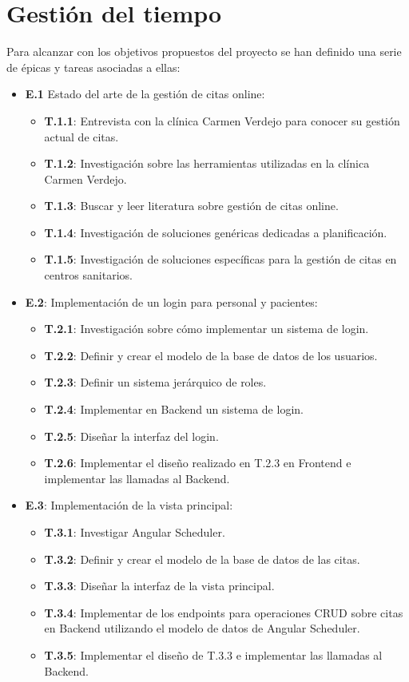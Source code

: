 \section{Gestión del tiempo}
Para alcanzar con los objetivos propuestos del proyecto se han definido una serie de épicas y tareas asociadas a ellas:
\begin{itemize}
    \item \textbf{E.1} Estado del arte de la gestión de citas online:
    \begin{itemize}
        \item \textbf{T.1.1}: Entrevista con la clínica Carmen Verdejo para conocer su gestión actual de citas.
        \item \textbf{T.1.2}: Investigación sobre las herramientas utilizadas en la clínica Carmen Verdejo.
        \item \textbf{T.1.3}: Buscar y leer literatura sobre gestión de citas online.
        \item \textbf{T.1.4}: Investigación de soluciones genéricas dedicadas a planificación.
        \item \textbf{T.1.5}: Investigación de soluciones específicas para la gestión de citas en centros sanitarios.
    \end{itemize}
    
    \item \textbf{E.2}: Implementación de un login para personal y pacientes:
    \begin{itemize}
        \item \textbf{T.2.1}: Investigación sobre cómo implementar un sistema de login.
        \item \textbf{T.2.2}: Definir y crear el modelo de la base de datos de los usuarios.
        \item \textbf{T.2.3}: Definir un sistema jerárquico de roles.
        \item \textbf{T.2.4}: Implementar en Backend un sistema de login.
        \item \textbf{T.2.5}: Diseñar la interfaz del login.
        \item \textbf{T.2.6}: Implementar el diseño realizado en T.2.3 en Frontend e implementar las llamadas al Backend.
    \end{itemize}
    
    \item \textbf{E.3}: Implementación de la vista principal:
    \begin{itemize}
        \item \textbf{T.3.1}: Investigar Angular Scheduler.
        \item \textbf{T.3.2}: Definir y crear el modelo de la base de datos de las citas.
        \item \textbf{T.3.3}: Diseñar la interfaz de la vista principal.
        \item \textbf{T.3.4}: Implementar de los endpoints para operaciones CRUD sobre citas en Backend utilizando el modelo de datos de Angular Scheduler.
        \item \textbf{T.3.5}: Implementar el diseño de T.3.3 e implementar las llamadas al Backend.
    \end{itemize}
    

\end{itemize}
